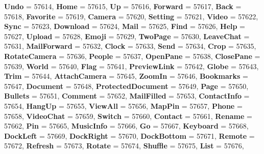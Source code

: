 \begin{DoxyCompactItemize}
{\bfseries Undo} = 57614, 
\newline
{\bfseries Home} = 57615, 
{\bfseries Up} = 57616, 
{\bfseries Forward} = 57617, 
{\bfseries Back} = 57618, 
\newline
{\bfseries Favorite} = 57619, 
{\bfseries Camera} = 57620, 
{\bfseries Setting} = 57621, 
{\bfseries Video} = 57622, 
\newline
{\bfseries Sync} = 57623, 
{\bfseries Download} = 57624, 
{\bfseries Mail} = 57625, 
{\bfseries Find} = 57626, 
\newline
{\bfseries Help} = 57627, 
{\bfseries Upload} = 57628, 
{\bfseries Emoji} = 57629, 
{\bfseries Two\+Page} = 57630, 
\newline
{\bfseries Leave\+Chat} = 57631, 
{\bfseries Mail\+Forward} = 57632, 
{\bfseries Clock} = 57633, 
{\bfseries Send} = 57634, 
\newline
{\bfseries Crop} = 57635, 
{\bfseries Rotate\+Camera} = 57636, 
{\bfseries People} = 57637, 
{\bfseries Open\+Pane} = 57638, 
\newline
{\bfseries Close\+Pane} = 57639, 
{\bfseries World} = 57640, 
{\bfseries Flag} = 57641, 
{\bfseries Preview\+Link} = 57642, 
\newline
{\bfseries Globe} = 57643, 
{\bfseries Trim} = 57644, 
{\bfseries Attach\+Camera} = 57645, 
{\bfseries Zoom\+In} = 57646, 
\newline
{\bfseries Bookmarks} = 57647, 
{\bfseries Document} = 57648, 
{\bfseries Protected\+Document} = 57649, 
{\bfseries Page} = 57650, 
\newline
{\bfseries Bullets} = 57651, 
{\bfseries Comment} = 57652, 
{\bfseries Mail\+Filled} = 57653, 
{\bfseries Contact\+Info} = 57654, 
\newline
{\bfseries Hang\+Up} = 57655, 
{\bfseries View\+All} = 57656, 
{\bfseries Map\+Pin} = 57657, 
{\bfseries Phone} = 57658, 
\newline
{\bfseries Video\+Chat} = 57659, 
{\bfseries Switch} = 57660, 
{\bfseries Contact} = 57661, 
{\bfseries Rename} = 57662, 
\newline
{\bfseries Pin} = 57665, 
{\bfseries Music\+Info} = 57666, 
{\bfseries Go} = 57667, 
{\bfseries Keyboard} = 57668, 
\newline
{\bfseries Dock\+Left} = 57669, 
{\bfseries Dock\+Right} = 57670, 
{\bfseries Dock\+Bottom} = 57671, 
{\bfseries Remote} = 57672, 
\newline
{\bfseries Refresh} = 57673, 
{\bfseries Rotate} = 57674, 
{\bfseries Shuffle} = 57675, 
{\bfseries List} = 57676, 
\newline

\end{DoxyCompactItemize}

